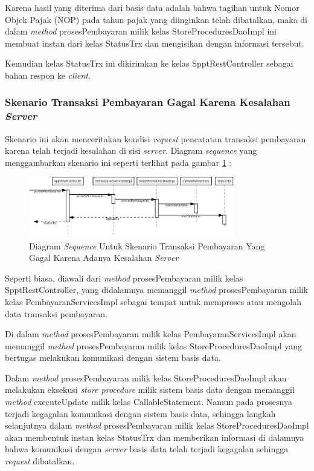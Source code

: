 \documentclass[pdftex,12pt, oneside]{article}
\begin{document}
Karena hasil yang diterima dari basis data adalah bahwa tagihan untuk Nomor Objek Pajak (NOP) pada tahun pajak yang diinginkan telah dibatalkan, maka di dalam \textit{method} prosesPembayaran milik kelas StoreProceduresDaoImpl ini membuat instan dari kelas StatusTrx dan mengisikan dengan informasi tersebut. 

Kemudian kelas StatusTrx ini dikirimkan ke kelas SpptRestController sebagai bahan respon ke \textit{client}.

\subsubsection{Skenario Transaksi Pembayaran Gagal Karena Kesalahan \textit{Server}}

Skenario ini akan menceritakan kondisi \textit{request} pencatatan transaksi pembayaran karena telah terjadi kesalahan di sisi \textit{server}. Diagram \textit{sequence} yang menggambarkan skenario ini seperti terlihat pada gambar \ref{fig:uml-seq-trx-db-error} :

\begin{figure}[H]
  \centering
  \includegraphics[width=0.8\textwidth]{./resources/diagram/uml-seq-trx-db-error}
  \caption{Diagram \textit{Sequence} Untuk Skenario Transaksi Pembayaran Yang Gagal Karena Adanya Kesalahan \textit{Server}}
  \label{fig:uml-seq-trx-db-error}
\end{figure}

Seperti biasa, diawali dari \textit{method} prosesPembayaran milik kelas SpptRestController, yang didalamnya memanggil \textit{method} prosesPembayaran milik kelas PembayaranServicesImpl sebagai tempat untuk memproses atau mengolah data transaksi pembayaran.

Di dalam \textit{method} prosesPembayaran milik kelas PembayaranServicesImpl akan memanggil \textit{method} prosesPembayaran milik kelas StoreProceduresDaoImpl yang bertugas melakukan komunikasi dengan sistem basis data.

Dalam \textit{method} prosesPembayaran milik kelas StoreProceduresDaoImpl akan melakukan eksekusi \textit{store procedure} milik sistem basis data dengan memanggil \textit{method} executeUpdate milik kelas CallableStatement. Namun pada prosesnya terjadi kegagalan komunikasi dengan sistem basis data, sehingga langkah selanjutnya dalam \textit{method} prosesPembayaran milik kelas StoreProceduresDaoImpl akan membentuk instan kelas StatusTrx dan memberikan informasi di dalamnya bahwa komunikasi dengan \textit{server} basis data telah terjadi kegagalan sehingga \textit{request} dibatalkan.
\end{document}
